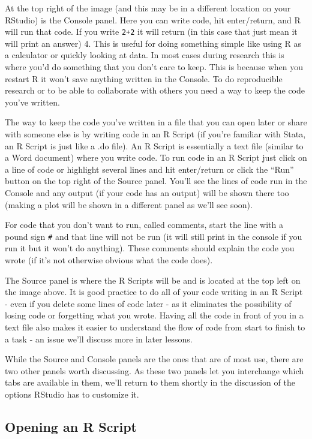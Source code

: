 \documentclass[
]{krantz}
\begin{document}
At the top right of the image (and this may be in a different location on your RStudio) is the Console panel. Here you can write code, hit enter/return, and R will run that code. If you write \texttt{2+2} it will return (in this case that just mean it will print an answer) 4. This is useful for doing something simple like using R as a calculator or quickly looking at data. In most cases during research this is where you'd do something that you don't care to keep. This is because when you restart R it won't save anything written in the Console. To do reproducible research or to be able to collaborate with others you need a way to keep the code you've written.

The way to keep the code you've written in a file that you can open later or share with someone else is by writing code in an R Script (if you're familiar with Stata, an R Script is just like a .do file). An R Script is essentially a text file (similar to a Word document) where you write code. To run code in an R Script just click on a line of code or highlight several lines and hit enter/return or click the ``Run'' button on the top right of the Source panel. You'll see the lines of code run in the Console and any output (if your code has an output) will be shown there too (making a plot will be shown in a different panel as we'll see soon).

For code that you don't want to run, called comments, start the line with a pound sign \texttt{\#} and that line will not be run (it will still print in the console if you run it but it won't do anything). These comments should explain the code you wrote (if it's not otherwise obvious what the code does).

The Source panel is where the R Scripts will be and is located at the top left on the image above. It is good practice to do all of your code writing in an R Script - even if you delete some lines of code later - as it eliminates the possibility of losing code or forgetting what you wrote. Having all the code in front of you in a text file also makes it easier to understand the flow of code from start to finish to a task - an issue we'll discuss more in later lessons.

While the Source and Console panels are the ones that are of most use, there are two other panels worth discussing. As these two panels let you interchange which tabs are available in them, we'll return to them shortly in the discussion of the options RStudio has to customize it.

\hypertarget{opening-an-r-script}{%
\subsection{Opening an R Script}\label{opening-an-r-script}}
\end{document}
